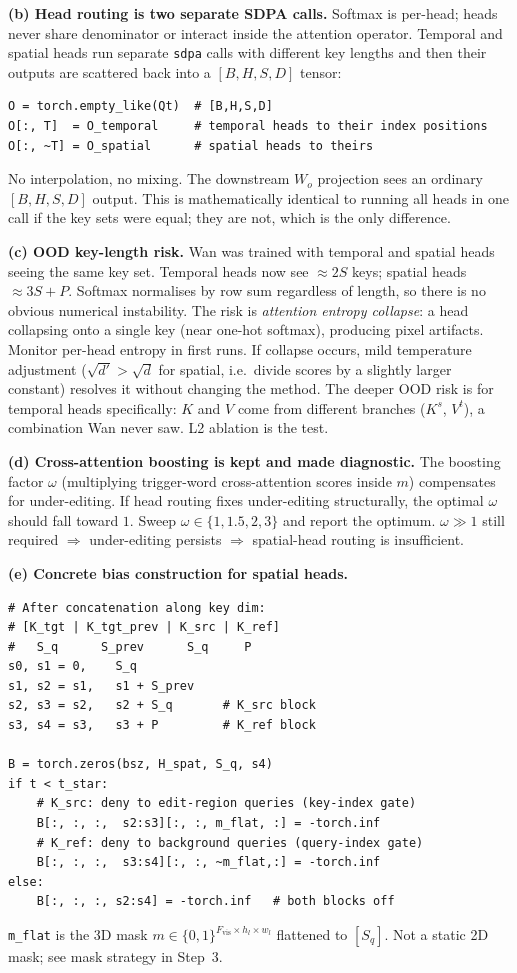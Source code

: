 \documentclass{article}
\begin{document}
\textbf{(b) Head routing is two separate SDPA calls.} Softmax is per-head;
heads never share denominator or interact inside the attention operator.
Temporal and spatial heads run separate \texttt{sdpa} calls with different key
lengths and then their outputs are scattered back into a $[B,H,S,D]$ tensor:
\begin{verbatim}
O = torch.empty_like(Qt)  # [B,H,S,D]
O[:, T]  = O_temporal     # temporal heads to their index positions
O[:, ~T] = O_spatial      # spatial heads to theirs
\end{verbatim}
No interpolation, no mixing. The downstream $W_o$ projection sees an ordinary
$[B,H,S,D]$ output. This is mathematically identical to running all heads in one
call if the key sets were equal; they are not, which is the only difference.

\textbf{(c) OOD key-length risk.} Wan was trained with temporal and spatial
heads seeing the same key set. Temporal heads now see $\approx 2S$ keys;
spatial heads $\approx 3S+P$. Softmax normalises by row sum regardless of
length, so there is no obvious numerical instability. The risk is
\emph{attention entropy collapse}: a head collapsing onto a single key (near
one-hot softmax), producing pixel artifacts. Monitor per-head entropy in first
runs. If collapse occurs, mild temperature adjustment ($\sqrt{d'} > \sqrt{d}$
for spatial, i.e.\ divide scores by a slightly larger constant) resolves it
without changing the method. The deeper OOD risk is for temporal heads
specifically: $K$ and $V$ come from different branches ($K^s$, $V^t$), a
combination Wan never saw. L2 ablation is the test.

\textbf{(d) Cross-attention boosting is kept and made diagnostic.} The boosting
factor $\omega$ (multiplying trigger-word cross-attention scores inside $m$)
compensates for under-editing. If head routing fixes under-editing structurally,
the optimal $\omega$ should fall toward $1$. Sweep $\omega \in \{1, 1.5, 2, 3\}$
and report the optimum. $\omega\gg1$ still required $\Rightarrow$ under-editing
persists $\Rightarrow$ spatial-head routing is insufficient.

\textbf{(e) Concrete bias construction for spatial heads.}
\begin{verbatim}
# After concatenation along key dim:
# [K_tgt | K_tgt_prev | K_src | K_ref]
#   S_q      S_prev      S_q     P
s0, s1 = 0,    S_q
s1, s2 = s1,   s1 + S_prev
s2, s3 = s2,   s2 + S_q       # K_src block
s3, s4 = s3,   s3 + P         # K_ref block

B = torch.zeros(bsz, H_spat, S_q, s4)
if t < t_star:
    # K_src: deny to edit-region queries (key-index gate)
    B[:, :, :,  s2:s3][:, :, m_flat, :] = -torch.inf
    # K_ref: deny to background queries (query-index gate)
    B[:, :, :,  s3:s4][:, :, ~m_flat,:] = -torch.inf
else:
    B[:, :, :, s2:s4] = -torch.inf   # both blocks off
\end{verbatim}
\texttt{m\_flat} is the 3D mask
$m \in \{0,1\}^{F_{\mathrm{vis}} \times h_l \times w_l}$
flattened to $[S_q]$. Not a static 2D mask; see mask strategy in Step~3.
\end{document}
